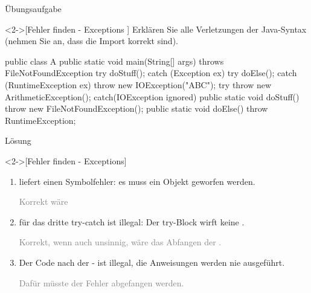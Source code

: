 \ifull
\begin{frame}[c,fragile]{Übungsaufgabe}
    \begin{exercise}<2->[Fehler finden - Exceptions ]
        \pause{}Erklären Sie alle Verletzungen der Java-Syntax (nehmen Sie an, dass die Import korrekt sind).\pause{}
\begin{plainvoid}
public class A {
  public static void main(String[] args) throws FileNotFoundException {
    try { doStuff(); } catch (Exception ex) {}
    try { doElse(); } catch (RuntimeException ex) {}
    throw new IOException("ABC");
    try {
      throw new ArithmeticException();
    } catch(IOException ignored) {}
  }
  public static void doStuff() { throw new FileNotFoundException(); }
  public static void doElse() { throw RuntimeException; }
}
\end{plainvoid}
    \end{exercise}
\end{frame}

\begin{frame}[c]{Lösung}
    \begin{solve}<2->[Fehler finden - Exceptions]
        \begin{enumerate}[<+(1)->]
            \item {} liefert einen Symbolfehler: es muss ein Objekt geworfen werden.\pause\par \textcolor{gray}{Korrekt wäre }
            \item {} für das dritte try-catch ist illegal: Der try-Block wirft keine .\pause\par \textcolor{gray}{Korrekt, wenn auch unsinnig, wäre das Abfangen der .}
            \item Der Code nach der - ist illegal, die Anweisungen werden nie ausgeführt.\pause\par \textcolor{gray}{Dafür müsste der Fehler abgefangen werden.}
        \end{enumerate}
    \end{solve}
\end{frame}


